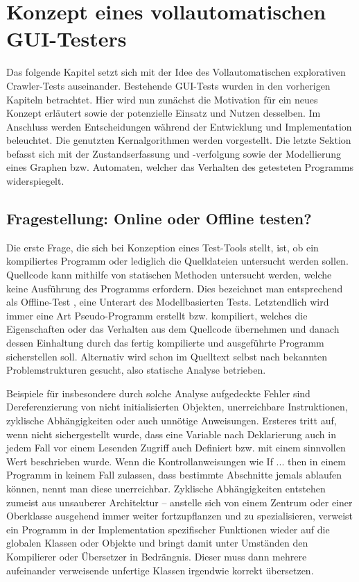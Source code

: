 \chapter{Konzept eines vollautomatischen GUI-Testers}\label{chapter:conceptfullautoguitesting}


Das folgende Kapitel setzt sich mit der Idee des \glqq{}Vollautomatischen explorativen Crawler-Tests\grqq{}
auseinander. Bestehende GUI-Tests wurden in den vorherigen Kapiteln betrachtet. Hier wird nun zunächst 
die Motivation für ein neues Konzept erläutert sowie der potenzielle Einsatz und Nutzen desselben.
Im Anschluss werden Entscheidungen während der Entwicklung und Implementation beleuchtet.
Die genutzten Kernalgorithmen werden vorgestellt. Die letzte Sektion befasst sich mit der
Zustandserfassung und -verfolgung sowie der Modellierung eines Graphen bzw. Automaten, welcher
das Verhalten des getesteten Programms widerspiegelt.


\section{Fragestellung: Online oder Offline testen?}\label{section:offoronlinetesting}


Die erste Frage, die sich bei Konzeption eines Test-Tools stellt, ist, ob ein kompiliertes Programm
oder lediglich die Quelldateien untersucht werden sollen. Quellcode kann mithilfe von statischen
Methoden untersucht werden, welche keine Ausführung des Programms erfordern. Dies bezeichnet man
entsprechend als \glqq{}Offline\grqq{}-Test \cite{offlinetesting}, eine Unterart des Modellbasierten Tests.
Letztendlich wird immer eine Art Pseudo-Programm erstellt bzw. kompiliert, welches die
Eigenschaften oder das Verhalten aus dem Quellcode übernehmen und danach dessen Einhaltung durch
das fertig kompilierte und ausgeführte Programm sicherstellen soll. Alternativ wird schon
im Quelltext selbst nach bekannten Problemstrukturen gesucht, also statische Analyse betrieben.

Beispiele für insbesondere durch solche Analyse aufgedeckte Fehler sind Dereferenzierung
von nicht initialisierten Objekten, unerreichbare Instruktionen, zyklische Abhängigkeiten
oder auch unnötige Anweisungen. Ersteres tritt auf, wenn nicht sichergestellt wurde,
dass eine Variable nach Deklarierung auch in jedem Fall vor einem Lesenden Zugriff auch
Definiert bzw. mit einem sinnvollen Wert beschrieben wurde. Wenn die Kontrollanweisungen
wie \glqq{}If ... then\grqq{} in einem Programm in keinem Fall zulassen, dass bestimmte
Abschnitte jemals ablaufen können, nennt man diese unerreichbar. Zyklische Abhängigkeiten
entstehen zumeist aus unsauberer Architektur -- anstelle sich von einem Zentrum oder einer
Oberklasse ausgehend immer weiter fortzupflanzen und zu spezialisieren, 
verweist ein Programm in der Implementation
spezifischer Funktionen wieder auf die globalen Klassen oder Objekte und bringt damit
unter Umständen den Kompilierer oder Übersetzer in Bedrängnis. Dieser muss dann mehrere 
aufeinander verweisende unfertige Klassen irgendwie korrekt übersetzen.

